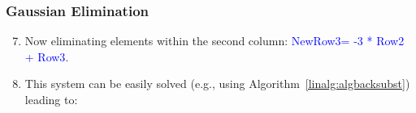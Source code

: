 \documentclass[10pt,compress]{beamer}
\begin{document}
\begin{frame}
  \frametitle{Gaussian Elimination} 
  \begin{enumerate}
  \setcounter{enumi}{6}
     \item <1-> Now eliminating elements within the second column: \textcolor{blue}{NewRow3= -3 * Row2 + Row3}.
   
     \item <3-> This system can be easily solved (e.g., using Algorithm~\ref{linalg:algbacksubst}) leading to:
  \end{enumerate}
\end{frame}
\end{document}

